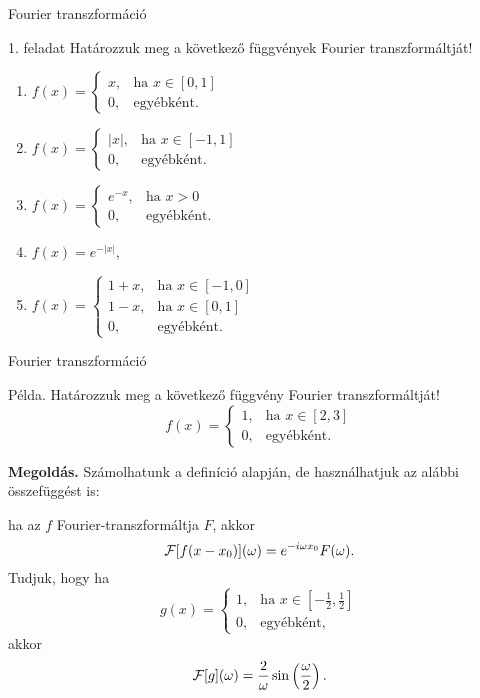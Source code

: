 \documentclass[table]{beamer}
\begin{document}
\begin{frame}[fragile]
{Fourier transzformáció}

\begin{exampleblock}{1. feladat}
Határozzuk meg a következő függvények Fourier transzformáltját!
\begin{enumerate}
\item $f(x)=\begin{cases}
x,&\mbox{ha }x\in[0,1]\\
0,&\mbox{egyébként.}
\end{cases}$
\item $f(x)=\begin{cases}
|x|,&\mbox{ha }x\in[-1,1]\\
0,&\mbox{egyébként.}
\end{cases}$
\item $f(x)=\begin{cases}
e^{-x},&\mbox{ha }x>0\\
0,&\mbox{egyébként.}
\end{cases}$
\item $f(x)=e^{-|x|}$,
\item $f(x)=\begin{cases}
1+x,&\mbox{ha }x\in[-1,0]\\
1-x,&\mbox{ha }x\in[0,1]\\
0,&\mbox{egyébként.}
\end{cases}$
\end{enumerate}
\end{exampleblock}
\end{frame}

\begin{frame}[fragile]
{Fourier transzformáció}
\begin{exampleblock}{P\'elda.}
Határozzuk meg a következő függvény Fourier transzformáltját!
\[
f(x)=\begin{cases}
1,&\mbox{ha }x\in[2,3]\\
0,&\mbox{egyébként.}
\end{cases}
\]
\end{exampleblock}
{\bf Megold\'as.} Sz\'amolhatunk a defin\'ici\'o alapj\'an, de haszn\'alhatjuk az al\'abbi 
\"osszef\"ugg\'est is: 

ha az $f$ Fourier-transzform\'altja $F$, akkor 
\[
{\cal F}[f(x-x_0)](\omega)=e^{-i\omega x_0}F(\omega). 
\]
Tudjuk, hogy ha 
\[
g(x)=\begin{cases}
1,&\mbox{ha }x\in\left[-\frac 12,\frac 12\right]\\
0,&\mbox{egyébként,}
\end{cases}
\]
akkor 
\[
{\cal F}[g](\omega)=\frac {2}{\omega}\sin\left( \frac{\omega}{2}\right).
\]
\end{frame}
\end{document}

